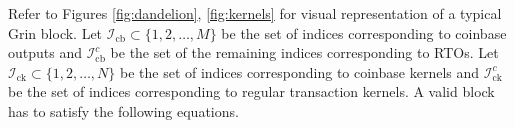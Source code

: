 %
Refer to Figures \ref{fig:dandelion}, \ref{fig:kernels} for visual representation of a typical Grin block.
Let $\mathcal{I}_{\text{cb}} \subset \{1,2,\ldots,M\}$ be the set of indices corresponding to coinbase outputs and $\mathcal{I}_{\text{cb}}^c$ be the set of the remaining indices corresponding to RTOs. Let $\mathcal{I}_{\text{ck}} \subset \{1,2,\ldots,N\}$ be the set of indices corresponding to coinbase kernels and $\mathcal{I}_{\text{ck}}^c$ be the set of indices corresponding to regular transaction kernels. A valid block has to satisfy the following equations.
